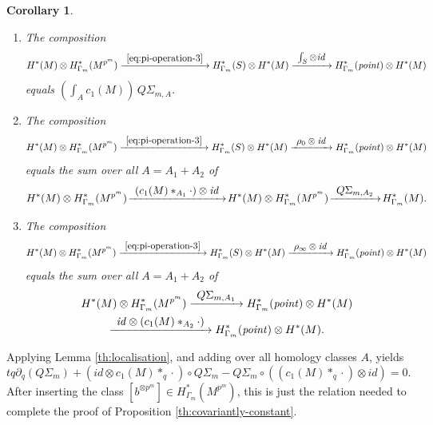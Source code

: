 \documentclass[JEP,XML,SOM,Unicode,NoFloatCountersInSection,published]{cedram}
\newcommand\To[1]{\mathchoice{\xrightarrow{\textstyle\kern4pt#1\kern3pt}}{\stackrel{#1}{\longrightarrow}}{}{}}
\theoremstyle{plain}
\newtheorem{corollary}[theorem]{Corollary}
\theoremstyle{definition}
\begin{document}
\skpt
\begin{corollary}
\begin{enumerate}
\item
The composition\vspace*{-5pt}
\begin{equation*}
H^*(M) \otimes H^*_{\Gamma_m}(M^{p^m}) \To{\eqref{eq:pi-operation-3}} H^*_{\Gamma_m}(S) \otimes H^*(M) \To{\int_S \otimes \mathit{id}} H^*_{\Gamma_m}(\mathit{point}) \otimes H^*(M)
\end{equation*}
equals $(\int_A c_1(M)) \, Q\Sigma_{m,A}$.

\smallskip
\item
The composition\vspace*{-5pt}
\begin{equation*}
H^*(M) \otimes H^*_{\Gamma_m}(M^{p^m}) \To{\eqref{eq:pi-operation-3}}
H^*_{\Gamma_m}(S) \otimes H^*(M) \To{\rho_0 \otimes \mathit{id}} H^*_{\Gamma_m}(\mathit{point}) \otimes H^*(M)
\end{equation*}
equals the sum over all $A = A_1+A_2$ of
\begin{equation*}
H^*(M) \otimes H^*_{\Gamma_m}(M^{p^m}) \!\To{(c_1(M) \ast_{A_1} \cdot) \otimes \mathit{id}}\! H^*(M) \otimes H^*_{\Gamma_m}(M^{p^m}) \!\To{Q\Sigma_{m,A_2}}\! H^*_{\Gamma_m}(M).
\end{equation*}

\item
The composition
\begin{equation*}
H^*(M) \otimes H^*_{\Gamma_m}(M^{p^m}) \To{\eqref{eq:pi-operation-3}}
H^*_{\Gamma_m}(S) \otimes H^*(M) \To{\rho_\infty \otimes \mathit{id}} H^*_{\Gamma_m}(\mathit{point}) \otimes H^*(M)
\end{equation*}
equals the sum over all $A = A_1+A_2$ of
\begin{multline*}
H^*(M) \otimes H^*_{\Gamma_m}(M^{p^m}) \To{Q\Sigma_{m,A_1}}
H^*_{\Gamma_m}(\mathit{point}) \otimes H^*(M)
\\
\To{\mathit{id} \otimes (c_1(M) \ast_{A_2} \cdot)} H^*_{\Gamma_m}(\mathit{point}) \otimes H^*(M).
\end{multline*}
\end{enumerate}
\end{corollary}

Applying Lemma \ref{th:localisation}, and adding over all homology classes $A$, yields
\begin{equation*}
tq\partial_q(Q\Sigma_m) + (\mathit{id} \otimes c_1(M) \ast_q \cdot) \circ Q\Sigma_m - Q\Sigma_m \circ
((c_1(M) \ast_q \cdot) \otimes \mathit{id}) = 0.
\end{equation*}
After inserting the class $[b^{\otimes p^m}] \in H^*_{\Gamma_m}(M^{p^m})$, this is just the relation needed to complete the proof of Proposition \ref{th:covariantly-constant}.
\end{document}
